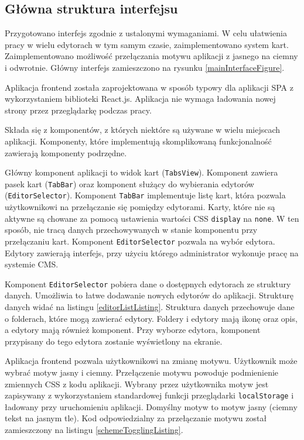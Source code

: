 \subsection{Główna struktura interfejsu}

Przygotowano interfejs zgodnie z ustalonymi wymaganiami. W celu ułatwienia pracy
w wielu edytorach w tym samym czasie, zaimplementowano system kart.
Zaimplementowano możliwość przełączania motywu aplikacji z jasnego na ciemny i
odwrotnie. Główny interfejs zamieszczono na rysunku \ref{mainInterfaceFigure}.

Aplikacja frontend została zaprojektowana w sposób typowy dla aplikacji SPA
\cite{mikowski2013single} z wykorzystaniem biblioteki React.js. Aplikacja nie
wymaga ładowania nowej strony przez przeglądarkę podczas pracy.

Składa się z komponentów, z których niektóre są używane w wielu miejscach
aplikacji. Komponenty, które implementują skomplikowaną funkcjonalność zawierają
komponenty podrzędne.

Główny komponent aplikacji to widok kart (\verb|TabsView|). Komponent zawiera
pasek kart (\verb|TabBar|) oraz komponent służący do wybierania edytorów
(\verb|EditorSelector|). Komponent \verb|TabBar| implementuje listę kart, która
pozwala użytkownikowi na przełączanie się pomiędzy edytorami. Karty, które nie
są aktywne są chowane za pomocą ustawienia wartości CSS \verb|display| na
\verb|none|. W ten sposób, nie tracą danych przechowywanych w stanie komponentu
przy przełączaniu kart. Komponent \verb|EditorSelector| pozwala na wybór
edytora. Edytory zawierają interfejs, przy użyciu którego administrator wykonuje
pracę na systemie CMS.

Komponent \verb|EditorSelector| pobiera dane o dostępnych edytorach ze struktury
danych. Umożliwia to łatwe dodawanie nowych edytorów do aplikacji. Strukturę
danych widać na listingu \ref{editorListListing}. Struktura danych przechowuje
dane o folderach, które mogą zawierać edytory. Foldery i edytory mają ikonę oraz
opis, a edytory mają również komponent. Przy wyborze edytora, komponent
przypisany do tego edytora zostanie wyświetlony na ekranie.



Aplikacja frontend pozwala użytkownikowi na zmianę motywu. Użytkownik może
wybrać motyw jasny i ciemny. Przełączenie motywu powoduje podmienienie zmiennych
CSS z kodu aplikacji. Wybrany przez użytkownika motyw jest zapisywany z
wykorzystaniem standardowej funkcji przeglądarki \verb|localStorage| i ładowany
przy uruchomieniu aplikacji. Domyślny motyw to motyw jasny (ciemny tekst na
jasnym tle). Kod odpowiedzialny za przełączanie motywu został zamieszczony na listingu
\ref{schemeTogglingListing}.

